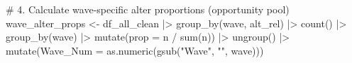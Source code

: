 \documentclass[
  letterpaper,
  DIV=11,
  numbers=noendperiod]{scrartcl}
\newenvironment{Shaded}{\begin{snugshade}}{\end{snugshade}}
\newcommand{\AttributeTok}[1]{\textcolor[rgb]{0.40,0.45,0.13}{#1}}
\newcommand{\CommentTok}[1]{\textcolor[rgb]{0.37,0.37,0.37}{#1}}
\newcommand{\FunctionTok}[1]{\textcolor[rgb]{0.28,0.35,0.67}{#1}}
\newcommand{\NormalTok}[1]{\textcolor[rgb]{0.00,0.23,0.31}{#1}}
\newcommand{\OtherTok}[1]{\textcolor[rgb]{0.00,0.23,0.31}{#1}}
\newcommand{\SpecialCharTok}[1]{\textcolor[rgb]{0.37,0.37,0.37}{#1}}
\newcommand{\StringTok}[1]{\textcolor[rgb]{0.13,0.47,0.30}{#1}}
\begin{document}
\begin{Shaded}
\begin{Highlighting}[]
\CommentTok{\# 4. Calculate wave{-}specific alter proportions (opportunity pool)}
\NormalTok{wave\_alter\_props }\OtherTok{\textless{}{-}}\NormalTok{ df\_all\_clean }\SpecialCharTok{|\textgreater{}}
  \FunctionTok{group\_by}\NormalTok{(wave, alt\_rel) }\SpecialCharTok{|\textgreater{}}
  \FunctionTok{count}\NormalTok{() }\SpecialCharTok{|\textgreater{}}
  \FunctionTok{group\_by}\NormalTok{(wave) }\SpecialCharTok{|\textgreater{}}
  \FunctionTok{mutate}\NormalTok{(}\AttributeTok{prop =}\NormalTok{ n }\SpecialCharTok{/} \FunctionTok{sum}\NormalTok{(n)) }\SpecialCharTok{|\textgreater{}}
  \FunctionTok{ungroup}\NormalTok{() }\SpecialCharTok{|\textgreater{}}
  \FunctionTok{mutate}\NormalTok{(}\AttributeTok{Wave\_Num =} \FunctionTok{as.numeric}\NormalTok{(}\FunctionTok{gsub}\NormalTok{(}\StringTok{"Wave"}\NormalTok{, }\StringTok{""}\NormalTok{, wave)))}


\end{Highlighting}
\end{Shaded}
\end{document}
